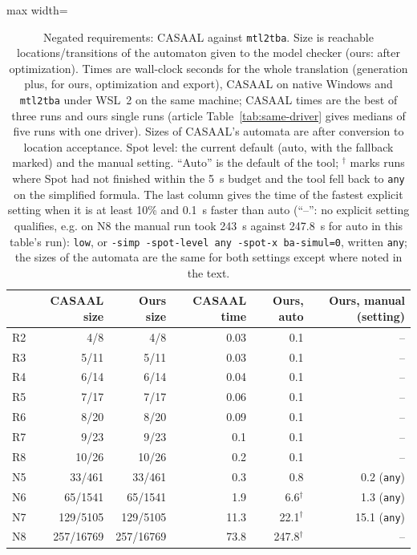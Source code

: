 \begin{table}[tp]
\centering
\caption{Negated requirements: CASAAL against \texttt{mtl2tba}. Size is reachable locations/transitions of the automaton given to the model checker (ours: after optimization). Times are wall-clock seconds for the whole translation (generation plus, for ours, optimization and export), CASAAL on native Windows and \texttt{mtl2tba} under WSL~2 on the same machine; CASAAL times are the best of three runs and ours single runs (article Table~\ref{tab:same-driver} gives medians of five runs with one driver). Sizes of CASAAL's automata are after conversion to location acceptance. Spot level: the current default (auto, with the fallback marked) and the manual setting. ``Auto'' is the default of the tool; $^{\dagger}$ marks runs where Spot had not finished within the 5~s budget and the tool fell back to \texttt{any} on the simplified formula. The last column gives the time of the fastest explicit setting when it is at least 10\% and 0.1~s faster than auto (``--'': no explicit setting qualifies, e.g. on N8 the manual run took 243~s against 247.8~s for auto in this table's run): \texttt{low}, or \texttt{-simp -spot-level any -spot-x ba-simul=0}, written \texttt{any}; the sizes of the automata are the same for both settings except where noted in the text.}
\label{tab:casaal-gen}
\scriptsize
\setlength{\tabcolsep}{4pt}
\begin{adjustbox}{max width=\textwidth}\begin{tabular}{@{}lrrrrr@{}}
\toprule
 & CASAAL size & Ours size & CASAAL time & Ours, auto & Ours, manual (setting)\\
\midrule
R2 & 4/8 & 4/8 & 0.03 & 0.1 & -- \\
R3 & 5/11 & 5/11 & 0.03 & 0.1 & -- \\
R4 & 6/14 & 6/14 & 0.04 & 0.1 & -- \\
R5 & 7/17 & 7/17 & 0.06 & 0.1 & -- \\
R6 & 8/20 & 8/20 & 0.09 & 0.1 & -- \\
R7 & 9/23 & 9/23 & 0.1 & 0.1 & -- \\
R8 & 10/26 & 10/26 & 0.2 & 0.1 & -- \\
N5 & 33/461 & 33/461 & 0.3 & 0.8 & 0.2 (\texttt{any}) \\
N6 & 65/1541 & 65/1541 & 1.9 & 6.6$^{\dagger}$ & 1.3 (\texttt{any}) \\
N7 & 129/5105 & 129/5105 & 11.3 & 22.1$^{\dagger}$ & 15.1 (\texttt{any}) \\
N8 & 257/16769 & 257/16769 & 73.8 & 247.8$^{\dagger}$ & -- \\
\bottomrule
\end{tabular}\end{adjustbox}
\end{table}
